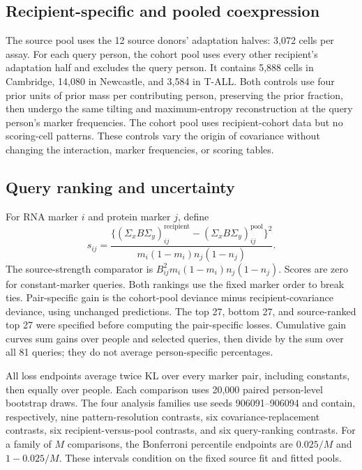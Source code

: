\subsection{Recipient-specific and pooled coexpression}

The source pool uses the 12 source donors' adaptation halves: 3,072 cells
per assay. For each query person, the cohort pool uses every other recipient's
adaptation half and excludes the query person. It contains 5,888 cells in
Cambridge, 14,080 in Newcastle, and 3,584 in T-ALL. Both controls use four prior
units of prior mass per contributing person, preserving the prior fraction, then
undergo the same tilting and maximum-entropy reconstruction at the query
person's marker frequencies. The cohort pool uses recipient-cohort data but
no scoring-cell patterns. These controls vary the origin of covariance
without changing the interaction, marker frequencies, or scoring tables.

\subsection{Query ranking and uncertainty}

For RNA marker $i$ and protein marker $j$, define
\[
 s_{ij}=
 \frac{\{(\Sigma_x B\Sigma_y)^{\mathrm{recipient}}_{ij}
       -(\Sigma_x B\Sigma_y)^{\mathrm{pool}}_{ij}\}^{2}}
 {m_i(1-m_i)n_j(1-n_j)}.
\]
The source-strength comparator is
$B_{ij}^{2}m_i(1-m_i)n_j(1-n_j)$.
Scores are zero for constant-marker queries. Both rankings use the fixed
marker order to break ties. Pair-specific gain is the cohort-pool deviance
minus recipient-covariance deviance, using unchanged predictions.
The top 27, bottom 27, and source-ranked top 27 were specified before
computing the pair-specific losses. Cumulative gain curves sum gains over
people and selected queries, then divide by the sum over all 81 queries;
they do not average person-specific percentages.

All loss endpoints average twice KL over every marker pair, including
constants, then equally over people. Each comparison uses 20,000 paired
person-level bootstrap draws. The four analysis families use seeds
906091--906094 and contain, respectively, nine pattern-resolution contrasts,
six covariance-replacement contrasts, six recipient-versus-pool contrasts,
and six query-ranking contrasts. For a family of $M$ comparisons, the
Bonferroni percentile endpoints are $0.025/M$ and $1-0.025/M$.
These intervals condition on the fixed source fit and fitted pools.

